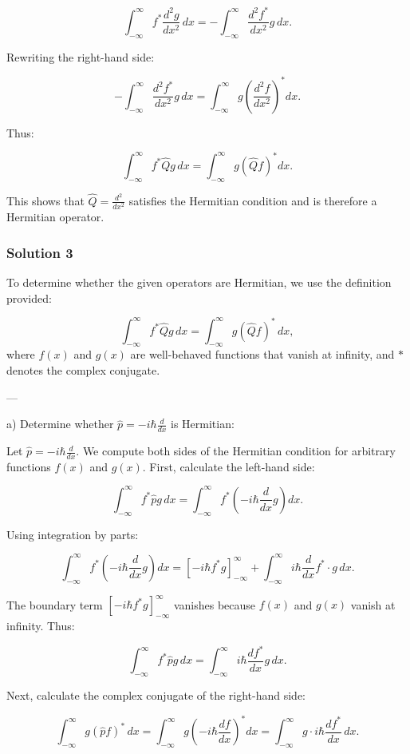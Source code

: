 \documentclass{article}
\begin{document}
\[
\int_{-\infty}^\infty f^* \frac{d^2 g}{dx^2} \, dx = - \int_{-\infty}^\infty \frac{d^2 f^*}{dx^2} g \, dx.
\]

Rewriting the right-hand side:

\[
- \int_{-\infty}^\infty \frac{d^2 f^*}{dx^2} g \, dx = \int_{-\infty}^\infty g \left(\frac{d^2 f}{dx^2}\right)^* dx.
\]

Thus:

\[
\int_{-\infty}^\infty f^* \hat{Q} g \, dx = \int_{-\infty}^\infty g (\hat{Q} f)^* dx.
\]

This shows that $\hat{Q} = \frac{d^2}{dx^2}$ satisfies the Hermitian condition and is therefore a Hermitian operator.


\subsubsection{Solution 3}
To determine whether the given operators are Hermitian, we use the definition provided:

\[
\int_{-\infty}^\infty f^* \hat{Q} g \, dx = \int_{-\infty}^\infty g (\hat{Q} f)^* \, dx,
\]
where \( f(x) \) and \( g(x) \) are well-behaved functions that vanish at infinity, and \( * \) denotes the complex conjugate. 

---

a) Determine whether \( \hat{p} = -i\hbar \frac{d}{dx} \) is Hermitian:

Let \( \hat{p} = -i\hbar \frac{d}{dx} \). We compute both sides of the Hermitian condition for arbitrary functions \( f(x) \) and \( g(x) \). First, calculate the left-hand side:

\[
\int_{-\infty}^\infty f^* \hat{p} g \, dx = \int_{-\infty}^\infty f^* \left(-i\hbar \frac{d}{dx} g\right) dx.
\]

Using integration by parts:

\[
\int_{-\infty}^\infty f^* \left(-i\hbar \frac{d}{dx} g\right) dx = \left[ -i\hbar f^* g \right]_{-\infty}^\infty + \int_{-\infty}^\infty i\hbar \frac{d}{dx} f^* \cdot g \, dx.
\]

The boundary term \( \left[ -i\hbar f^* g \right]_{-\infty}^\infty \) vanishes because \( f(x) \) and \( g(x) \) vanish at infinity. Thus:

\[
\int_{-\infty}^\infty f^* \hat{p} g \, dx = \int_{-\infty}^\infty i\hbar \frac{d f^*}{dx} g \, dx.
\]

Next, calculate the complex conjugate of the right-hand side:

\[
\int_{-\infty}^\infty g (\hat{p} f)^* \, dx = \int_{-\infty}^\infty g \left(-i\hbar \frac{df}{dx}\right)^* dx = \int_{-\infty}^\infty g \cdot i\hbar \frac{d f^*}{dx} \, dx.
\]
\end{document}
